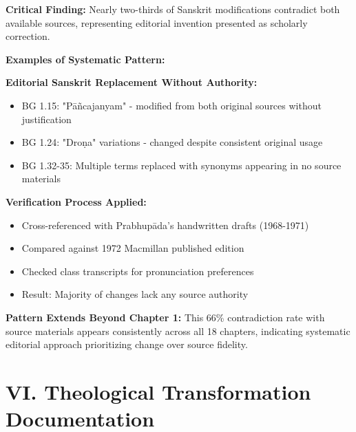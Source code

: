 \documentclass[11pt,twoside]{book}
\begin{document}
\textbf{\textbf{Critical Finding:}} Nearly two-thirds of Sanskrit modifications contradict both available sources, representing editorial invention presented as scholarly correction.

\textbf{\textbf{Examples of Systematic Pattern:}}

\textbf{\textbf{Editorial Sanskrit Replacement Without Authority:}}
\begin{itemize}
\item BG 1.15: "Pāñcajanyam" - modified from both original sources without justification
\item BG 1.24: "Droṇa" variations - changed despite consistent original usage
\item BG 1.32-35: Multiple terms replaced with synonyms appearing in no source materials
\end{itemize}

\textbf{\textbf{Verification Process Applied:}}
\begin{itemize}
\item Cross-referenced with Prabhupāda's handwritten drafts (1968-1971)
\item Compared against 1972 Macmillan published edition
\item Checked class transcripts for pronunciation preferences
\item Result: Majority of changes lack any source authority
\end{itemize}

\textbf{\textbf{Pattern Extends Beyond Chapter 1:}}
This 66\% contradiction rate with source materials appears consistently across all 18 chapters, indicating systematic editorial approach prioritizing change over source fidelity.
\section*{VI. Theological Transformation Documentation}
\label{sec:org861d5a2}
\end{document}
